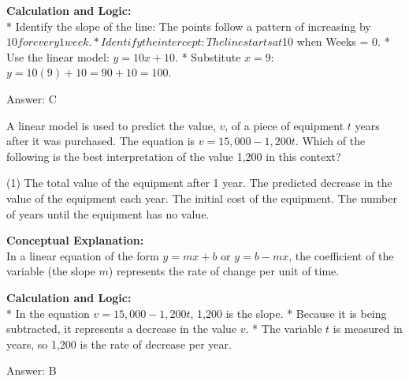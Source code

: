 \documentclass[11pt,paper=a4,answers]{exam}
\begin{document}
\begin{questions}
\begin{solution}
\vspace{30pt}

\textbf{Calculation and Logic:} \\
* Identify the slope of the line: The points follow a pattern of increasing by $10 for every 1 week.
* Identify the intercept: The line starts at $10 when Weeks = 0.
* Use the linear model: $y = 10x + 10$.
* Substitute $x = 9$: $y = 10(9) + 10 = 90 + 10 = 100$.

\vspace{30pt}

Answer: \colorbox{yellow!100}{C}
\end{solution}

\vspace{60pt}

\question
A linear model is used to predict the value, $v$, of a piece of equipment $t$ years after it was purchased. The equation is $v = 15,000 - 1,200t$. Which of the following is the best interpretation of the value 1,200 in this context?
\begin{tasks}(1)
    \task The total value of the equipment after 1 year.
    \task The predicted decrease in the value of the equipment each year.
    \task The initial cost of the equipment.
    \task The number of years until the equipment has no value.
\end{tasks}

\begin{solution}
\textbf{Conceptual Explanation:} \\
In a linear equation of the form $y = mx + b$ or $y = b - mx$, the coefficient of the variable (the slope $m$) represents the rate of change per unit of time.

\vspace{30pt}

\textbf{Calculation and Logic:} \\
* In the equation $v = 15,000 - 1,200t$, 1,200 is the slope.
* Because it is being subtracted, it represents a decrease in the value $v$.
* The variable $t$ is measured in years, so 1,200 is the rate of decrease per year.

\vspace{30pt}

Answer: \colorbox{yellow!100}{B}
\end{solution}

\vspace{60pt}


\end{questions}
\end{document}
